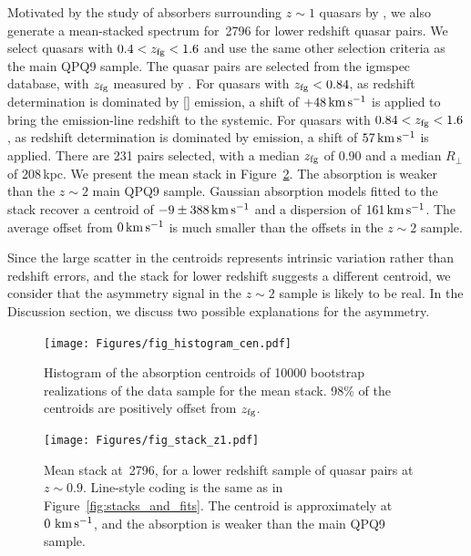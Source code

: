 \documentclass[iop]{emulateapj}
\begin{document}
Motivated by the study of  absorbers surrounding $z\sim1$ quasars by \cite{Johnson+15}, 
we also generate a mean-stacked spectrum for \,2796 for lower redshift quasar pairs.  
We select quasars with $0.4<z_{\rm fg}<1.6$ and use the same other selection criteria as the main 
QPQ9 sample. The quasar pairs are selected from the igmspec database, with $z_{\rm fg}$ measured 
by \cite{HewettWild10}. For quasars with $z_{\rm fg}<0.84$, as redshift determination is dominated 
by [] emission, a shift of $+48\,{\rm km\,s^{-1}}$ is applied to bring the emission-line 
redshift to the systemic. For quasars with $0.84<z_{\rm fg}<1.6$, as redshift determination is 
dominated by  emission, a shift of $57\,{\rm km\,s^{-1}}$ is applied. There are 231 
pairs selected, with a median $z_{\rm fg}$ of 0.90 and a median $R_\perp$ of 208\,kpc. We present 
the mean stack in Figure~\ref{fig:stack_z1}. The absorption is weaker than the $z\sim2$ main QPQ9 
sample. Gaussian absorption models fitted to the stack recover a centroid of 
$-9\pm388\,{\rm km\,s^{-1}}$ and a dispersion of $161\,{\rm km\,s^{-1}}$. The average offset 
from $0\,{\rm km\,s^{-1}}$ is much smaller than the offsets in the $z\sim2$ sample. 

Since the large scatter in the centroids represents intrinsic variation rather than redshift 
errors, and the  stack for lower redshift suggests a different centroid, we 
consider that the asymmetry signal in the $z\sim2$ sample is likely to be real. In the Discussion 
section, we discuss two possible explanations for the asymmetry. 

\begin{figure}
\texttt{[image: Figures/fig\_histogram\_cen.pdf]}
\caption{Histogram of the absorption centroids of 10000 bootstrap realizations of the data sample 
for the  mean stack. 98\% of the centroids are positively offset from $z_{\rm fg}$.}
\label{fig:histogram_cen}
\end{figure}

\begin{figure}
\texttt{[image: Figures/fig\_stack\_z1.pdf]}
\caption{Mean stack at \,2796, for a lower redshift sample of quasar pairs at 
$z\sim0.9$. Line-style coding is the same as in Figure~\ref{fig:stacks_and_fits}. The centroid is 
approximately at $0\,{\rm \,km\,s^{-1}}$, and the absorption is weaker than the main QPQ9 sample. 
}
\label{fig:stack_z1}
\end{figure}
\end{document}
